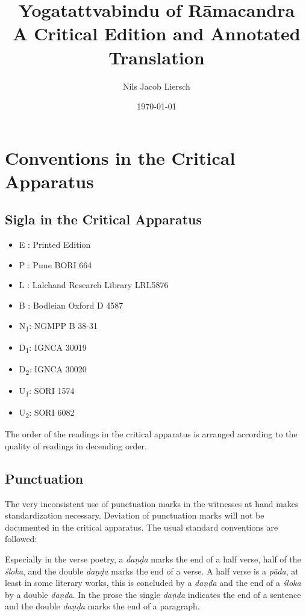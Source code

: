 \documentclass[12pt]{article}%
\author{Nils Jacob Liersch}
\title{Yogatattvabindu of Rāmacandra\\ A Critical Edition and Annotated Translation}
\date{\today}
\def\acpc#1#2#3{{#1}\rlap{\textrm{\textsuperscript{#3}}}\textsubscript{\textrm{#2}}\space}
\def\sigl#1#2{{{#1}}\textsubscript{\textrm{#2}}}
\def\None{{\sigl{N}{1}}} \def\Noneac{\acpc{N}{1}{ac}\,} \def\Nonepc{\acpc{N}{1}{pc}\,}
\def\Done{{\sigl{D}{1}}} \def\Doneac{\acpc{D}{1}{ac}\,} \def\Donepc{\acpc{D}{1}{pc}\,}
\def\Dtwo{{\sigl{D}{2}}} \def\Dtwoac{\acpc{D}{2}{ac}\,} \def\Dtwopc{\acpc{D}{2}{pc}\,}
\def\Uone{{\sigl{U}{1}}} \def\Uoneac{\acpc{U}{1}{ac}\,} \def\Uonepc{\acpc{U}{1}{pc}\,}
\def\Utwo{{\sigl{U}{2}}} \def\Utwoac{\acpc{U}{2}{ac}\,} \def\Utwopc{\acpc{U}{2}{pc}\,}
\begin{document}
\maketitle
\clearpage

\section{Conventions in the Critical Apparatus}
\subsection{Sigla in the Critical Apparatus}

\begin{itemize}
\item E : Printed Edition
\item P : Pune BORI 664
\item L : Lalchand Research Library LRL5876
\item B : Bodleian Oxford D 4587
\item \None : NGMPP B 38-31
\item \Done : IGNCA 30019
\item \Dtwo : IGNCA 30020
\item \Uone : SORI 1574
\item \Utwo: SORI 6082
\end{itemize}

The order of the readings in the critical apparatus is arranged according to the quality of readings in decending order.  

\subsection{Punctuation}

The very inconsistent use of punctuation marks in the witnesses at hand makes standardization necessary. Deviation of punctuation marks will not be documented in the critical apparatus. The usual standard conventions are followed:

Especially in the verse poetry, a \textit{daṇḍa} marks the end of a half verse, half of the \textit{śloka}, and the double \textit{daṇḍa} marks the end of a verse. A half verse is a \textit{pāda}, at least in some literary works, this is concluded by a \textit{daṇḍa} and the end of a \textit{śloka} by a double \textit{daṇḍa}. In the prose the single \textit{daṇḍa} indicates the end of a sentence and the double \textit{daṇḍa} marks the end of a paragraph.
\end{document}

